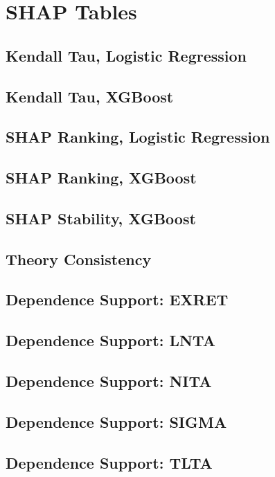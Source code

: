 \documentclass[11pt,a4paper]{article}
\newcommand{\tablefile}[2]{%
  \clearpage
  \subsection*{#1}
  \begingroup
  
  \endgroup
}
\begin{document}
\section{SHAP Tables}
\tablefile{Kendall Tau, Logistic Regression}{outputs/tables/shap/kendall_tau_logistic_regression.tex}
\tablefile{Kendall Tau, XGBoost}{outputs/tables/shap/kendall_tau_xgboost.tex}
\tablefile{SHAP Ranking, Logistic Regression}{outputs/tables/shap/shap_ranking_logistic_regression.tex}
\tablefile{SHAP Ranking, XGBoost}{outputs/tables/shap/shap_ranking_xgboost.tex}
\tablefile{SHAP Stability, XGBoost}{outputs/tables/shap/shap_stability_xgboost.tex}
\tablefile{Theory Consistency}{outputs/tables/shap/theory_consistency_table.tex}
\tablefile{Dependence Support: EXRET}{outputs/tables/shap/dependence_support_exret_xgboost.tex}
\tablefile{Dependence Support: LNTA}{outputs/tables/shap/dependence_support_lnta_xgboost.tex}
\tablefile{Dependence Support: NITA}{outputs/tables/shap/dependence_support_nita_xgboost.tex}
\tablefile{Dependence Support: SIGMA}{outputs/tables/shap/dependence_support_sigma_xgboost.tex}
\tablefile{Dependence Support: TLTA}{outputs/tables/shap/dependence_support_tlta_xgboost.tex}
\end{document}
